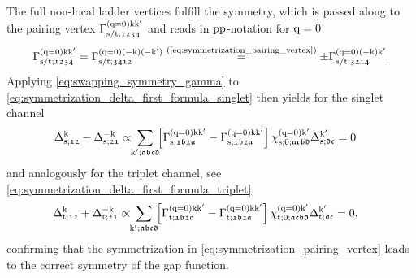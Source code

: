 \documentclass[main.tex]{subfiles}
\begin{document}
The full non-local ladder vertices fulfill the  symmetry, which is passed along to the pairing vertex $\Gamma^{(\text{q}=0)\text{k}\text{k}'}_{\text{s}/\text{t};\mathfrak{1234}}$ and reads in $\text{pp}$-notation for $\text{q}=0$ \cite{GallerAbInitio2017}
\begin{align}\label{eq:swapping_symmetry_gamma}
	\Gamma^{(\text{q}=0)\text{k}\text{k}'}_{\text{s}/\text{t};\mathfrak{1234}}=\Gamma^{(\text{q}=0)(-\text{k})(-\text{k}')}_{\text{s}/\text{t};\mathfrak{3412}}\overset{\text{(\ref{eq:symmetrization_pairing_vertex})}}{=}\pm \Gamma^{(\text{q}=0)(-\text{k})\text{k}'}_{\text{s}/\text{t};\mathfrak{3214}}.
\end{align}
Applying \eqref{eq:swapping_symmetry_gamma} to \eqref{eq:symmetrization_delta_first_formula_singlet} then yields for the singlet channel
\begin{align}
	\Delta_{\text{s};\mathfrak{12}}^{\text{k}}-\Delta_{\text{s};\mathfrak{21}}^{-\text{k}}&\propto\!\!\sum_{\text{k}';\mathfrak{abcd}}\!\! \left [\Gamma^{(\text{q}=0)\text{k}\text{k}'}_{\text{s};\mathfrak{1b2a}}-\Gamma^{(\text{q}=0)\text{k}\text{k}'}_{\text{s};\mathfrak{1b2a}}\right ]\chi^{(\text{q}=0)\text{k}'}_{\text{s};0;\mathfrak{acbd}}\Delta_{\text{s};\mathfrak{dc}}^{\text{k}'}=0
\end{align}
and analogously for the triplet channel, see \eqref{eq:symmetrization_delta_first_formula_triplet},
\begin{align}
	\Delta_{\text{t};\mathfrak{12}}^{\text{k}}+\Delta_{\text{t};\mathfrak{21}}^{-\text{k}}&\propto\!\!\sum_{\text{k}';\mathfrak{abcd}}\!\! \left [\Gamma^{(\text{q}=0)\text{k}\text{k}'}_{\text{t};\mathfrak{1b2a}}-\Gamma^{(\text{q}=0)\text{k}\text{k}'}_{\text{t};\mathfrak{1b2a}}\right ]\chi^{(\text{q}=0)\text{k}'}_{\text{t};0;\mathfrak{acbd}}\Delta_{\text{t};\mathfrak{dc}}^{\text{k}'}=0,
\end{align}
confirming that the symmetrization in \eqref{eq:symmetrization_pairing_vertex} leads to the correct symmetry of the gap function.

\printbibliography
\end{document}
